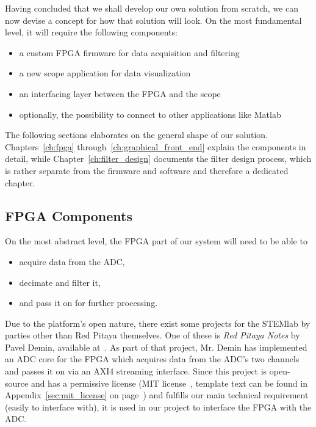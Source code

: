 Having concluded that  we shall develop our own solution  from scratch, we can
now devise a concept for how that solution will look.  On the most fundamental
level, it will require the following components:
\begin{itemize}
    \item
        a custom FPGA firmware for data acquisition and filtering
    \item
        a new scope application for data visualization
    \item
        an interfacing layer between the FPGA and the scope
    \item
        optionally, the possibility to connect to other applications like Matlab
\end{itemize}
The   following   sections   elaborates   on  the   general   shape   of   our
solution. Chapters~\ref{ch:fpga}  through~\ref{ch:graphical_front_end} explain
the components  in detail, while Chapter~\ref{ch:filter_design}  documents the
filter design process, which is rather separate from the firmware and software
and therefore a dedicated chapter.

%
%
\subsection{FPGA Components} %
\label{subsec:concept:fpga_components}

On the most abstract level, the FPGA part of our system will need to be able to
\begin{itemize}\tightlist
    \item
        acquire data from the ADC,
    \item
        decimate and filter it,
    \item
        and pass it on for further processing.
\end{itemize}

Due to the  platform's open nature, there exist some  projects for the STEMlab
by parties other than Red Pitaya  themselves. One of these is \emph{Red Pitaya
Notes} by  Pavel Demin, available  at~\cite{pita:github:pitaya-notes}. As part
of that  project, Mr. Demin  has implemented  an ADC core  for the  FPGA which
acquires  data from  the ADC's  two  channels and  passes  it on  via an  AXI4
streaming interface\footnotemark.
Since   this   project  is   open-source   and   has  a   permissive   license
(MIT   license~\cite{licenses:mit},   template   text    can   be   found   in
Appendix~\ref{sec:mit_license} on page~\pageref{sec:mit_license}) and fulfills
our main technical  requirement (easily to interface with), it  is used in our
project to interface the FPGA with the ADC.


